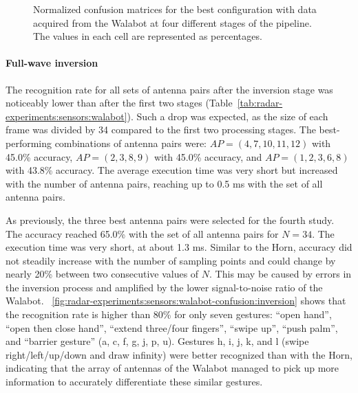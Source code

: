 \begin{figure}[!tb]
    \vspace{-6pt}
    \caption{Normalized confusion matrices for the best configuration with data acquired from the Walabot at four different stages of the pipeline. The values in each cell are represented as percentages.}
    \label{fig:radar-experiments:sensors:walabot-confusion}
\end{figure}


\paragraph{Full-wave inversion}
The recognition rate for all sets of antenna pairs after the inversion stage was noticeably lower than after the first two stages (Table~\ref{tab:radar-experiments:sensors:walabot}). Such a drop was expected, as the size of each frame was divided by 34 compared to the first two processing stages. 
%
The best-performing combinations of antenna pairs were: $AP{=}(4, 7, 10, 11, 12)$ with 45.0\% accuracy, $AP{=}(2, 3, 8, 9)$ with 45.0\% accuracy, and $AP{=}(1, 2, 3, 6, 8)$ with 43.8\% accuracy. The average execution time was very short but increased with the number of antenna pairs, reaching up to 0.5 ms with the set of all antenna pairs. 

As previously, the three best antenna pairs were selected for the fourth study. The accuracy reached 65.0\% with the set of all antenna pairs for $N{=}34$. The execution time was very short, at about 1.3 ms. 
Similar to the Horn, accuracy did not steadily increase with the number of sampling points and could change by nearly 20\% between two consecutive values of $N$. This may be caused by errors in the inversion process and amplified by the lower signal-to-noise ratio of the Walabot.
%
\fig~\ref{fig:radar-experiments:sensors:walabot-confusion:inversion} shows that the recognition rate is higher than 80\% for only seven gestures: ``open hand'', ``open then close hand'', ``extend three/four fingers'', ``swipe up'', ``push palm'', and ``barrier gesture'' (a, c, f, g, j, p, u). 
%
Gestures h, i, j, k, and l (swipe right/left/up/down and draw infinity) were better recognized than with the Horn, indicating that the array of antennas of the Walabot managed to pick up more information to accurately differentiate these similar gestures.

